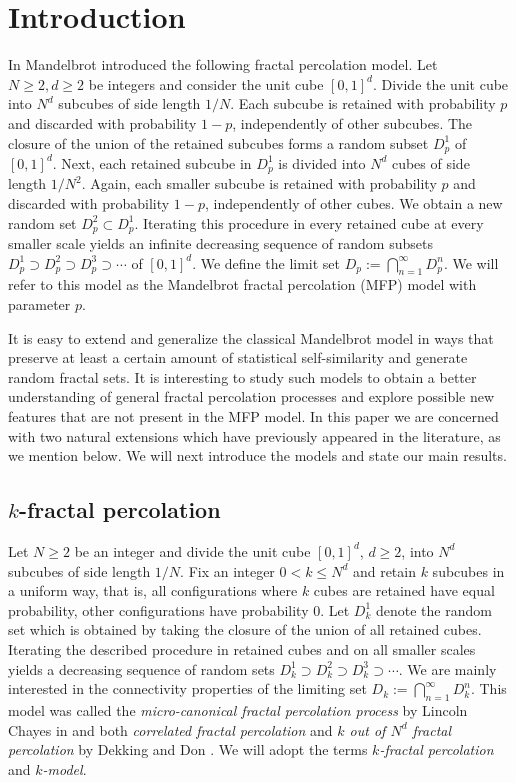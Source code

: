 \documentclass[11pt,a4paper]{article}
\theoremstyle{remark}
\begin{document}
\section{Introduction}\label{sec introduction}

In \cite{Man} Mandelbrot introduced the following fractal percolation model. Let $N \geq 2, d\geq 2$ be integers and consider the unit cube $[0,1]^{d}$. Divide the unit cube into $N^{d}$ subcubes of side length $1/N$. Each subcube is retained with probability $p$ and discarded with probability $1-p$, independently of other subcubes. The closure of the union of the retained subcubes forms a random subset $D^{1}_{p}$ of $[0,1]^d$. Next, each retained subcube in $D^{1}_{p}$ is divided into $N^d$ cubes of side length $1/N^{2}$. Again, each smaller subcube is retained with probability $p$ and discarded with probability $1-p$, independently of other cubes. We obtain a new random set $D^{2}_{p} \subset D^1_{p}$. Iterating this procedure in every retained cube at every smaller scale yields an infinite decreasing sequence of random subsets $D^1_{p} \supset D_p^2 \supset D_p^3 \supset \cdots$ of $[0,1]^d$. We define the limit set $D_{p} := \bigcap_{n=1}^{\infty} D^{n}_{p}$. We will refer to this model as the Mandelbrot fractal percolation (MFP) model with parameter $p$. 


It is easy to extend and generalize the classical Mandelbrot model in ways that preserve at least a certain amount of statistical self-similarity and generate random fractal sets. It is interesting to study such models to obtain a better understanding of general fractal percolation processes and explore possible new features that are not present in the MFP model. In this paper we are concerned with two natural extensions which have previously appeared in the literature, as we mention below. We will next introduce the models and state our main results.


\subsection[k-fractal percolation]{$k$-fractal percolation}
Let $N \geq 2$ be an integer and divide the unit cube $[0,1]^d$, $d \geq 2$, into $N^d$ subcubes of side length $1/N$. Fix an integer $0 < k  \leq N^d$ and retain $k$ subcubes in a uniform way, that is, all configurations where $k$ cubes are retained have equal probability, other configurations have probability 0. Let $D_k^{1}$ denote the random set which is obtained by taking the closure of the union of all retained cubes.
Iterating the described procedure in retained cubes and on all smaller scales yields a decreasing sequence of random sets $D_k^1 \supset D_k^2 \supset D_k^3 \supset \cdots$. We are mainly interested in the connectivity properties of the limiting set $D_{k} := \bigcap_{n=1}^\infty D^{n}_{k}$.
This model was called the \emph{micro-canonical fractal percolation process} by Lincoln Chayes in \cite{Cha} and both \emph{correlated fractal percolation} and \emph{$k$ out of $N^d$ fractal percolation} by Dekking and Don \cite{DekDon}. We will adopt the terms \emph{$k$-fractal percolation} and \emph{$k$-model}. 
\end{document}
